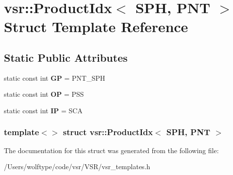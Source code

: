 \hypertarget{structvsr_1_1_product_idx_3_01_s_p_h_00_01_p_n_t_01_4}{\section{vsr\-:\-:Product\-Idx$<$ S\-P\-H, P\-N\-T $>$ Struct Template Reference}
\label{structvsr_1_1_product_idx_3_01_s_p_h_00_01_p_n_t_01_4}
}
\subsection*{Static Public Attributes}
\begin{DoxyCompactItemize}
\item 
\hypertarget{structvsr_1_1_product_idx_3_01_s_p_h_00_01_p_n_t_01_4_a14d30bbfc5fb8bb352321468982dd67c}{static const int {\bfseries G\-P} = P\-N\-T\-\_\-\-S\-P\-H}\label{structvsr_1_1_product_idx_3_01_s_p_h_00_01_p_n_t_01_4_a14d30bbfc5fb8bb352321468982dd67c}

\item 
\hypertarget{structvsr_1_1_product_idx_3_01_s_p_h_00_01_p_n_t_01_4_a7e4529877e3b55a2e91dd8eb782675ed}{static const int {\bfseries O\-P} = P\-S\-S}\label{structvsr_1_1_product_idx_3_01_s_p_h_00_01_p_n_t_01_4_a7e4529877e3b55a2e91dd8eb782675ed}

\item 
\hypertarget{structvsr_1_1_product_idx_3_01_s_p_h_00_01_p_n_t_01_4_a89a71a805aa473ee0e8ba12cced143dd}{static const int {\bfseries I\-P} = S\-C\-A}\label{structvsr_1_1_product_idx_3_01_s_p_h_00_01_p_n_t_01_4_a89a71a805aa473ee0e8ba12cced143dd}

\end{DoxyCompactItemize}
\subsubsection*{template$<$$>$ struct vsr\-::\-Product\-Idx$<$ S\-P\-H, P\-N\-T $>$}



The documentation for this struct was generated from the following file\-:\begin{DoxyCompactItemize}
\item 
/\-Users/wolftype/code/vsr/\-V\-S\-R/vsr\-\_\-templates.\-h\end{DoxyCompactItemize}
